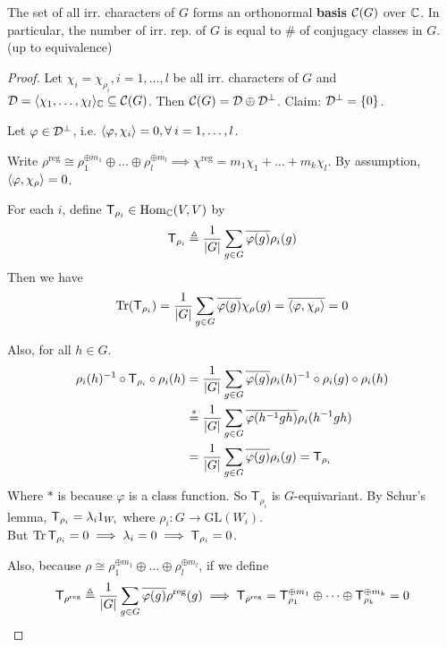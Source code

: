 \begin{theorem}
  The set of all irr. characters of $G$ forms an orthonormal {\bf basis}
  $\mathcal{C}(G)$ over $\mathbb{C}$. In particular, the number of irr. rep. of $G$ is equal
  to \# of conjugacy classes in $G$. (up to equivalence)

  \begin{proof}
    Let $\chi_i = \chi_{\rho_i}, i = 1, \dots, l$ be all irr.
    characters of $G$ and $\mathcal{D} = \langle\chi_1, \dots, \chi_l\rangle_{\mathbb{C}}
    \subseteq \mathcal{C}(G)$. Then $\mathcal{C}(G) = \mathcal{D} \oplus \mathcal{D}^\perp$.
    Claim: $\mathcal{D}^\perp = \{0\}$.

    Let $\varphi \in \mathcal{D}^\perp$, i.e. $\inpd{\varphi, \chi_i} = 0,
    \forall i = 1,\dots, l$.

    Write $\rho^{\text{reg}} \cong \rho_1^{\oplus m_1} \oplus\dots\oplus\rho_l^{\oplus m_l}
    \implies \chi^{\text{reg}} = m_1\chi_1 + \dots + m_k\chi_l$.
    By assumption, $\langle\varphi, \chi_\rho\rangle = 0$.

    For each $i$, define ${\sf T}_{\rho_i} \in \operatorname{Hom}_{\mathbb{C}}(V, V)$ by
      \[
        {\sf T}_{\rho_i} \triangleq
        \frac{1}{\lvert G\rvert} \sum_{g\in G} \overline{\varphi(g)} \rho_i(g)
      \]
    Then we have
      \[
        \operatorname{Tr}({\sf T}_{\rho_i}) =
        \frac{1}{\lvert G\rvert} \sum_{g\in G} \overline{\varphi(g)} \chi_\rho(g)
        = \overline{\langle\varphi, \chi_\rho\rangle} = 0
      \]

      Also, for all $h \in G$.
      \begin{align*}
        \rho_i(h)^{-1}\circ{\sf T}_{\rho_i} \circ\rho_i(h)
        &= \frac{1}{\lvert G\rvert} \sum_{g\in G}
        \overline{\varphi(g)} \rho_i(h)^{-1}\circ\rho_i(g)\circ\rho_i(h) \\
        & \stackrel{*}{=} \frac{1}{\lvert G\rvert} \sum_{g \in G} \overline{\varphi(h^{-1} g h)} \rho_i(h^{-1}gh) \\
        & = \frac{1}{\lvert G\rvert} \sum_{g \in G} \overline{\varphi(g)} \rho_i(g) = \mathsf{T}_{\rho_i}
      \end{align*}
      Where $*$ is because $\varphi$ is a class function.  So $\mathsf{T}_{\rho_i}$ is $G$-equivariant.
      By Schur's lemma,
      ${\sf T}_{\rho_i} = \lambda_i 1_{W_i}$ where
      $\rho_i: G\to \text{GL}(W_i)$. \\
      But $\operatorname{Tr}{{\sf T}_{\rho_i}} = 0 \implies \lambda_i = 0
      \implies {\sf T}_{\rho_i} = 0$.

      Also, because $\rho \cong \rho_1^{\oplus m_1} \oplus\dots\oplus\rho_l^{\oplus m_l}$,
      if we define
      \[
        {\sf T}_{\rho^{\text{reg}}} \triangleq
        \frac{1}{\lvert G\rvert} \sum_{g\in G} \overline{\varphi(g)} \rho^{\text{reg}}(g)
        \implies \mathsf{T}_{\rho^{\text{reg}}}
        = \mathsf{T}^{\oplus m_1}_{\rho_1} \oplus \cdots \oplus
        \mathsf{T}^{\oplus m_k}_{\rho_k} = 0
      \]


\end{proof}
\end{theorem}

